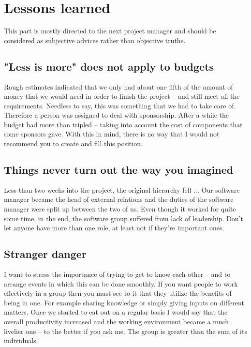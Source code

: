 
\section{Lessons learned}\label{sec:learnings}
This part is mostly directed to the next project manager and should be considered as subjective advices rather than objective truths.

\subsection{"Less is more" does not apply to budgets}
Rough estimates indicated that we only had about one fifth of the amount of money that we would need in order to finish the project -- and still meet all the requirements. Needless to say, this was something that we had to take care of. Therefore a person was assigned to deal with sponsorship. After a while the budget had more than tripled -- taking into account the cost of components that some sponsors gave. With this in mind, there is no way that I would not recommend you to create and fill this position.
\subsection{Things never turn out the way you imagined}
Less than two weeks into the project, the original hierarchy fell ... Our software manager became the head of external relations and the duties of the software manager were split up between the two of us. Even though it worked for quite some time, in the end, the software group suffered from lack of leadership. Don't let anyone have more than one role, at least not if they're important ones.
\subsection{Stranger danger}
I want to stress the importance of trying to get to know each other -- and to arrange events in which this can be done smoothly. If you want people to work effectively in a group then you must see to it that they utilize the benefits of being in one. For example sharing knowledge or simply giving inputs on different matters.
Once we started to eat out on a regular basis I would say that the overall productivity increased and the working environment became a much livelier one -- to the better if you ask me. The group is greater than the sum of its individuals.
